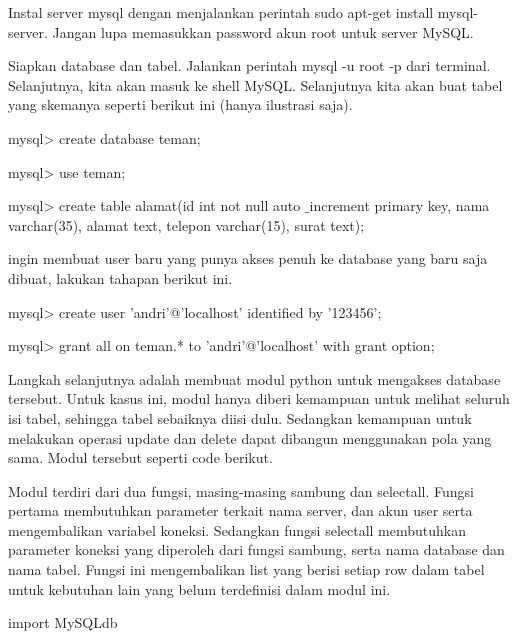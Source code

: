 \documentclass{wileySix}
\begin{document}
\begin{myEnumerate}
	\item Instal server mysql dengan menjalankan perintah sudo apt-get install mysql-server. Jangan lupa memasukkan password akun root untuk server MySQL. \par
	\noindent 
	\item Siapkan database dan tabel. Jalankan perintah mysql -u root -p dari terminal. Selanjutnya, kita akan masuk ke shell MySQL. Selanjutnya kita akan buat tabel yang skemanya seperti berikut ini (hanya ilustrasi saja). \par
	mysql> create database teman; \par
	mysql> use teman; \hspace*{1.69in}  \par
	mysql> create table alamat(id int not null auto $  \_  $increment primary key, nama varchar(35), alamat text, telepon varchar(15), surat text); \par
	\vspace{12pt}
	\noindent 
	\item  ingin membuat user baru yang punya akses penuh ke database yang baru saja dibuat, lakukan tahapan berikut ini. \par
	mysql> create user 'andri'@'localhost' identified by '123456'; \par
	mysql> grant all on teman.* to 'andri'@'localhost' with grant option; \par
	\noindent 
	\item Langkah selanjutnya adalah membuat modul python untuk mengakses database tersebut. Untuk kasus ini, modul hanya diberi kemampuan untuk melihat seluruh isi tabel, sehingga tabel sebaiknya diisi dulu. Sedangkan kemampuan untuk melakukan operasi update dan delete dapat dibangun menggunakan pola yang sama. Modul tersebut seperti code berikut.\end{myEnumerate}
\par
\vspace{12pt}
Modul terdiri dari dua fungsi, masing-masing sambung dan selectall. Fungsi pertama membutuhkan parameter terkait nama server, dan akun user serta mengembalikan variabel koneksi. Sedangkan fungsi selectall membutuhkan parameter koneksi yang diperoleh dari fungsi sambung, serta nama database dan nama tabel. Fungsi ini mengembalikan list yang berisi setiap row dalam tabel untuk kebutuhan lain yang belum terdefinisi dalam modul ini. \par
\vspace{12pt}
\noindent 
import MySQLdb \par
\end{document}
